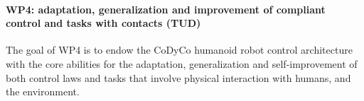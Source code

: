 

\paragraph*{WP4: adaptation, generalization and improvement of compliant control and tasks with contacts (TUD)}

The goal of WP4 is to endow the CoDyCo humanoid robot control architecture with
the core abilities for the adaptation, generalization and self-improvement of
both control laws and tasks that involve physical interaction with humans, and
the environment.
